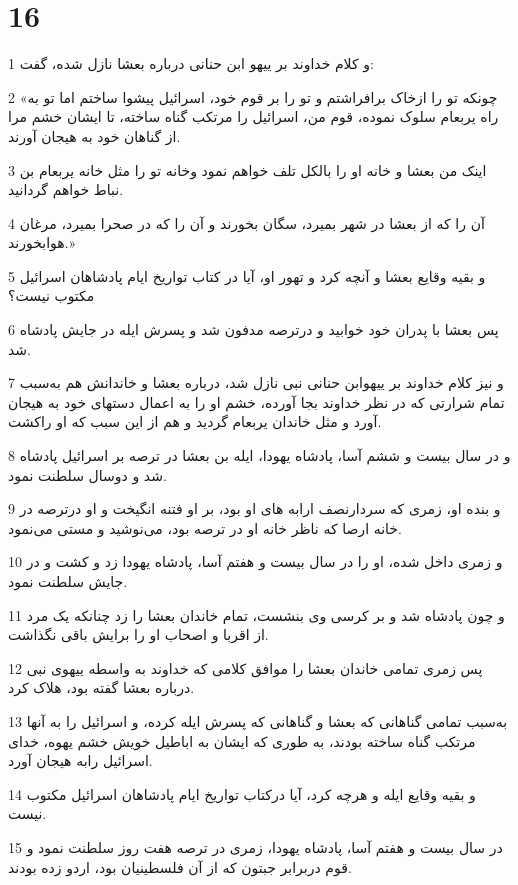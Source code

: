 \chapter{16}

\par 1 و کلام خداوند بر ییهو ابن حنانی درباره بعشا نازل شده، گفت:
\par 2 «چونکه تو را ازخاک برافراشتم و تو را بر قوم خود، اسرائیل پیشوا ساختم اما تو به راه یربعام سلوک نموده، قوم من، اسرائیل را مرتکب گناه ساخته، تا ایشان خشم مرا از گناهان خود به هیجان آورند.
\par 3 اینک من بعشا و خانه او را بالکل تلف خواهم نمود وخانه تو را مثل خانه یربعام بن نباط خواهم گردانید.
\par 4 آن را که از بعشا در شهر بمیرد، سگان بخورند و آن را که در صحرا بمیرد، مرغان هوابخورند.»
\par 5 و بقیه وقایع بعشا و آنچه کرد و تهور او، آیا در کتاب تواریخ ایام پادشاهان اسرائیل مکتوب نیست؟
\par 6 پس بعشا با پدران خود خوابید و درترصه مدفون شد و پسرش ایله در جایش پادشاه شد.
\par 7 و نیز کلام خداوند بر ییهوابن حنانی نبی نازل شد، درباره بعشا و خاندانش هم به‌سبب تمام شرارتی که در نظر خداوند بجا آورده، خشم او را به اعمال دستهای خود به هیجان آورد و مثل خاندان یربعام گردید و هم از این سبب که او راکشت.
\par 8 و در سال بیست و ششم آسا، پادشاه یهودا، ایله بن بعشا در ترصه بر اسرائیل پادشاه شد و دوسال سلطنت نمود.
\par 9 و بنده او، زمری که سردارنصف ارابه های او بود، بر او فتنه انگیخت و او درترصه در خانه ارصا که ناظر خانه او در ترصه بود، می‌نوشید و مستی می‌نمود.
\par 10 و زمری داخل شده، او را در سال بیست و هفتم آسا، پادشاه یهودا زد و کشت و در جایش سلطنت نمود.
\par 11 و چون پادشاه شد و بر کرسی وی بنشست، تمام خاندان بعشا را زد چنانکه یک مرد از اقربا و اصحاب او را برایش باقی نگذاشت.
\par 12 پس زمری تمامی خاندان بعشا را موافق کلامی که خداوند به واسطه ییهوی نبی درباره بعشا گفته بود، هلاک کرد.
\par 13 به‌سبب تمامی گناهانی که بعشا و گناهانی که پسرش ایله کرده، و اسرائیل را به آنها مرتکب گناه ساخته بودند، به طوری که ایشان به اباطیل خویش خشم یهوه، خدای اسرائیل رابه هیجان آورد.
\par 14 و بقیه وقایع ایله و هرچه کرد، آیا درکتاب تواریخ ایام پادشاهان اسرائیل مکتوب نیست.
\par 15 در سال بیست و هفتم آسا، پادشاه یهودا، زمری در ترصه هفت روز سلطنت نمود و قوم دربرابر جبتون که از آن فلسطینیان بود، اردو زده بودند.
